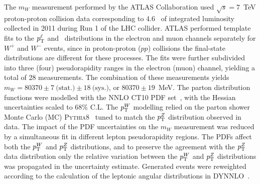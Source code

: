 The $m_W$ measurement performed by the ATLAS Collaboration used $\sqrt{s}=7$~TeV proton-proton collision data
corresponding to 4.6~\ifb{} of integrated luminosity collected in 2011 during Run 1 of the LHC collider.
ATLAS performed template fits to the $p^{\ell}_{\scriptsize\textrm{T}}$ and \mT~distributions in the electron and muon
channels separately for
$W^+$ and $W^-$ events, since in proton-proton ($pp$) collisions the final-state distributions are different for these
processes.  The fits were further subdivided into three (four) pseudorapidity ranges in the electron (muon) channel,
yielding a total of 28 measurements.  The combination of these measurements yields 
$m_W=80370\pm7~\textrm{(stat.)}\pm18~\textrm{(sys.)}$, or $80370\pm19$~MeV.  The parton distribution functions were
modelled with the NNLO CT10 PDF set~\cite{Lai:2010vv}, with the Hessian uncertainties scaled to 68\% C.L.  The
$p_{\scriptsize\textrm{T}}^{W}$ modelling relied on the parton shower Monte Carlo (MC)
{\textsc{Pythia8}}~\cite{Sjostrand:2014zea} tuned to match the $p_{\scriptsize\textrm{T}}^{Z}$ distribution observed in
data.  The impact of the PDF uncertainties on the $m_W$ measurement was reduced by a simultaneous fit in different lepton
pseudorapidity regions.  The PDFs affect both the $p_{\scriptsize\textrm{T}}^{W}$ and $p_{\scriptsize\textrm{T}}^{Z}$
distributions, and to preserve the agreement with the $p_{\scriptsize\textrm{T}}^{Z}$ data distribution only the relative
variation between the $p_{\scriptsize\textrm{T}}^{W}$ and $p_{\scriptsize\textrm{T}}^{Z}$ distributions was propagated in
the uncertainty estimate.  Generated events were reweighted according to the calculation of the leptonic angular 
distributions in DYNNLO~\cite{Catani:2007vq,Catani:2009sm}.

